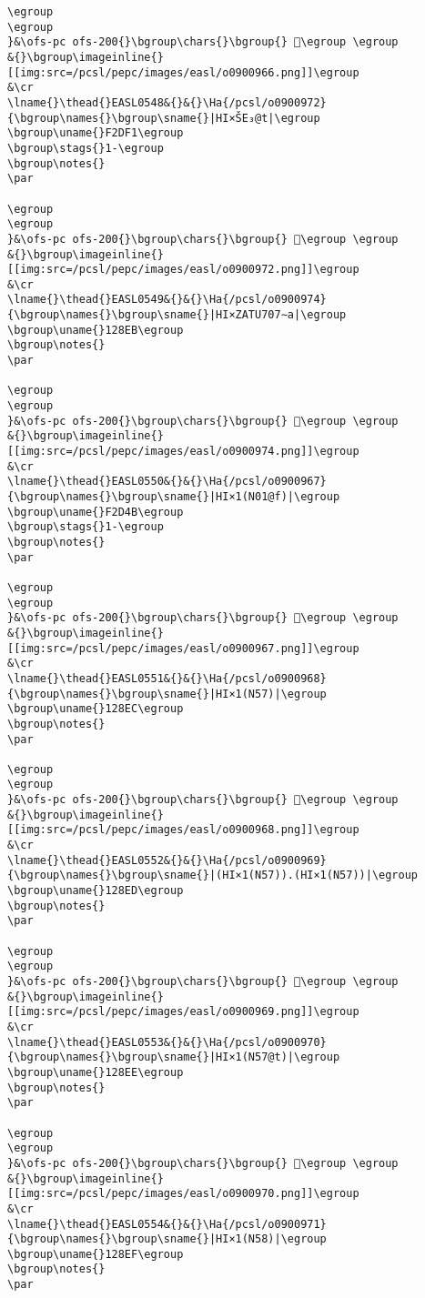\begin{verbatim}
\egroup
\egroup
}&\ofs-pc ofs-200{}\bgroup\chars{}\bgroup{} 𒣪\egroup \egroup
&{}\bgroup\imageinline{}[[img:src=/pcsl/pepc/images/easl/o0900966.png]]\egroup
&\cr
\lname{}\thead{}EASL0548&{}&{}\Ha{/pcsl/o0900972}{\bgroup\names{}\bgroup\sname{}|HI×ŠE₃@t|\egroup
\bgroup\uname{}F2DF1\egroup
\bgroup\stags{}1-\egroup
\bgroup\notes{}
\par 

\egroup
\egroup
}&\ofs-pc ofs-200{}\bgroup\chars{}\bgroup{} 󲷱\egroup \egroup
&{}\bgroup\imageinline{}[[img:src=/pcsl/pepc/images/easl/o0900972.png]]\egroup
&\cr
\lname{}\thead{}EASL0549&{}&{}\Ha{/pcsl/o0900974}{\bgroup\names{}\bgroup\sname{}|HI×ZATU707∼a|\egroup
\bgroup\uname{}128EB\egroup
\bgroup\notes{}
\par 

\egroup
\egroup
}&\ofs-pc ofs-200{}\bgroup\chars{}\bgroup{} 𒣫\egroup \egroup
&{}\bgroup\imageinline{}[[img:src=/pcsl/pepc/images/easl/o0900974.png]]\egroup
&\cr
\lname{}\thead{}EASL0550&{}&{}\Ha{/pcsl/o0900967}{\bgroup\names{}\bgroup\sname{}|HI×1(N01@f)|\egroup
\bgroup\uname{}F2D4B\egroup
\bgroup\stags{}1-\egroup
\bgroup\notes{}
\par 

\egroup
\egroup
}&\ofs-pc ofs-200{}\bgroup\chars{}\bgroup{} 󲵋\egroup \egroup
&{}\bgroup\imageinline{}[[img:src=/pcsl/pepc/images/easl/o0900967.png]]\egroup
&\cr
\lname{}\thead{}EASL0551&{}&{}\Ha{/pcsl/o0900968}{\bgroup\names{}\bgroup\sname{}|HI×1(N57)|\egroup
\bgroup\uname{}128EC\egroup
\bgroup\notes{}
\par 

\egroup
\egroup
}&\ofs-pc ofs-200{}\bgroup\chars{}\bgroup{} 𒣬\egroup \egroup
&{}\bgroup\imageinline{}[[img:src=/pcsl/pepc/images/easl/o0900968.png]]\egroup
&\cr
\lname{}\thead{}EASL0552&{}&{}\Ha{/pcsl/o0900969}{\bgroup\names{}\bgroup\sname{}|(HI×1(N57)).(HI×1(N57))|\egroup
\bgroup\uname{}128ED\egroup
\bgroup\notes{}
\par 

\egroup
\egroup
}&\ofs-pc ofs-200{}\bgroup\chars{}\bgroup{} 𒣭\egroup \egroup
&{}\bgroup\imageinline{}[[img:src=/pcsl/pepc/images/easl/o0900969.png]]\egroup
&\cr
\lname{}\thead{}EASL0553&{}&{}\Ha{/pcsl/o0900970}{\bgroup\names{}\bgroup\sname{}|HI×1(N57@t)|\egroup
\bgroup\uname{}128EE\egroup
\bgroup\notes{}
\par 

\egroup
\egroup
}&\ofs-pc ofs-200{}\bgroup\chars{}\bgroup{} 𒣮\egroup \egroup
&{}\bgroup\imageinline{}[[img:src=/pcsl/pepc/images/easl/o0900970.png]]\egroup
&\cr
\lname{}\thead{}EASL0554&{}&{}\Ha{/pcsl/o0900971}{\bgroup\names{}\bgroup\sname{}|HI×1(N58)|\egroup
\bgroup\uname{}128EF\egroup
\bgroup\notes{}
\par 


\end{verbatim}
